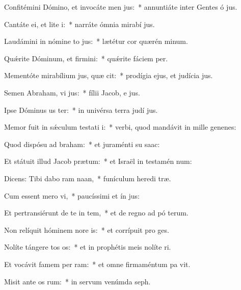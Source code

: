 \item Confitémini Dómino, et invocáte men jus:~* annuntiáte inter Gentes ó jus.
\item Cantáte ei, et lite i:~* narráte ómnia mirabí jus.
\item Laudámini in nómine to jus:~* lætétur cor quærén minum.
\item Quǽrite Dóminum, et firmini:~* quǽrite fáciem  per.
\item Mementóte mirabílium jus, quæ cit:~* prodígia ejus, et judícia  jus.
\item Semen Abraham, vi jus:~* fílii Jacob, e jus.
\item Ipse Dóminus us ter:~* in univérsa terra judí jus.
\item Memor fuit in sǽculum testati i:~* verbi, quod mandávit in mille genenes:
\item Quod dispósu ad braham:~* et juraménti su  saac:
\item Et státuit illud Jacob  prætum:~* et Israël in testamén num:
\item Dicens: Tibi dabo ram naan,~* funículum heredi træ.
\item Cum essent mero vi,~* paucíssimi et ín jus:
\item Et pertransiérunt de te in tem,~* et de regno ad pó terum.
\item Non relíquit hóminem nore is:~* et corrípuit pro  ges.
\item Nolíte tángere tos os:~* et in prophétis meis nolíte ri.
\item Et vocávit famem per ram:~* et omne firmaméntum pa vit.
\item Misit ante os rum:~* in servum venúmda  seph.
